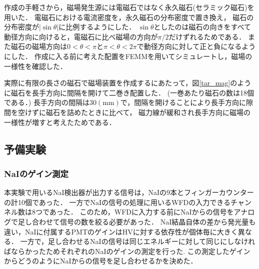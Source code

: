 
作成の手軽さから，磁場発生源には電磁石ではなく永久磁石(セラミック磁石)を用いた．
電磁石における電流密度を，永久磁石の分布密度で置き換え，
磁石の分布密度が$|\sin\theta|$に比例するようにした．
$\sin\theta$としたのは磁石の向きをすべて動径方向に向けると，電磁石に比べ磁場の方向が$\pi/2$だけずれるためである．
また磁石の磁場方向は$0<\theta<\pi$と$\pi<\theta<2\pi$で動径方向に対して正と負になるようにした．
作成に入る前に考えた配置をFEMMを用いてシミュレートし，磁場の一様性を確認した．


実際に有限の長さの磁石で磁場装置を作成するにあたって，図\ref{tar_mag}のように磁石を長手方向に間隔を開けて二巻き配置した．
(一巻あたり磁石の数は18個である．)
長手方向の間隔は$30(\mathrm{mm})$で，間隔を開けることにより長手方向に隙間を空けずに磁石を詰めたときに比べて，
磁力線が緩和され長手方向に磁場の一様性が増すと考えたためである．

\newpage
\subsection{予備実験}

\subsubsection{NaIのゲイン測定}
本実験で用いるNaI検出器が出力する信号は，NaIの9本とフィンガーカウンターの計10個であった．
一方でNaIの信号の処理に用いるWFDの入力できるチャンネル数は8つであった．
このため，WFDに入力する前にNaIからの信号をアナログで足し合わせて信号の数を絞る必要があった．
NaI結晶自体の差から発光量も違い，NaIに付属するPMTのゲインはHVに対する依存性が個体毎に大きく異なる．
一方で，足し合わせるNaIの信号は同じエネルギーに対して同じにしなければならかったためそれぞれのNaIのゲインの測定を行った.
この測定したゲインからどうのようにNaIからの信号を足し合わせるかを決めた．

